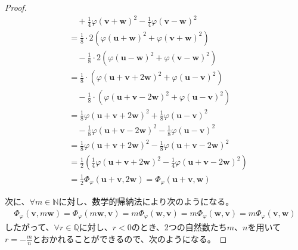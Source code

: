 \documentclass[dvipdfmx]{jsarticle}
\begin{document}
\begin{proof}
\begin{align*}
&\quad + \frac{1}{4}{\varphi\left( \mathbf{v} + \mathbf{w} \right)}^{2} - \frac{1}{4}{\varphi\left( \mathbf{v} - \mathbf{w} \right)}^{2}\\
&= \frac{1}{8} \cdot 2\left( {\varphi\left( \mathbf{u} + \mathbf{w} \right)}^{2} + {\varphi\left( \mathbf{v} + \mathbf{w} \right)}^{2} \right) \\
&\quad - \frac{1}{8} \cdot 2\left( {\varphi\left( \mathbf{u} - \mathbf{w} \right)}^{2} + {\varphi\left( \mathbf{v} - \mathbf{w} \right)}^{2} \right)\\
&= \frac{1}{8} \cdot \left( {\varphi\left( \mathbf{u} + \mathbf{v} + 2\mathbf{w} \right)}^{2} + {\varphi\left( \mathbf{u} - \mathbf{v} \right)}^{2} \right) \\
&\quad - \frac{1}{8} \cdot \left( {\varphi\left( \mathbf{u} + \mathbf{v} - 2\mathbf{w} \right)}^{2} + {\varphi\left( \mathbf{u} - \mathbf{v} \right)}^{2} \right)\\
&= \frac{1}{8}{\varphi\left( \mathbf{u} + \mathbf{v} + 2\mathbf{w} \right)}^{2} + \frac{1}{8}{\varphi\left( \mathbf{u} - \mathbf{v} \right)}^{2} \\
&\quad - \frac{1}{8}{\varphi\left( \mathbf{u} + \mathbf{v} - 2\mathbf{w} \right)}^{2} - \frac{1}{8}{\varphi\left( \mathbf{u} - \mathbf{v} \right)}^{2}\\
&= \frac{1}{8}{\varphi\left( \mathbf{u} + \mathbf{v} + 2\mathbf{w} \right)}^{2} - \frac{1}{8}{\varphi\left( \mathbf{u} + \mathbf{v} - 2\mathbf{w} \right)}^{2}\\
&= \frac{1}{2}\left( \frac{1}{4}{\varphi\left( \mathbf{u} + \mathbf{v} + 2\mathbf{w} \right)}^{2} - \frac{1}{4}{\varphi\left( \mathbf{u} + \mathbf{v} - 2\mathbf{w} \right)}^{2} \right)\\
&= \frac{1}{2}\varPhi_{\varphi}\left( \mathbf{u} + \mathbf{v},2\mathbf{w} \right) = \varPhi_{\varphi}\left( \mathbf{u} + \mathbf{v},\mathbf{w} \right)
\end{align*}\par
次に、$\forall m \in \mathbb{N}$に対し、数学的帰納法により次のようになる。
\begin{align*}
\varPhi_{\varphi}\left( \mathbf{v},m\mathbf{w} \right) = \varPhi_{\varphi}\left( m\mathbf{w},\mathbf{v} \right) = m\varPhi_{\varphi}\left( \mathbf{w},\mathbf{v} \right) = m\varPhi_{\varphi}\left( \mathbf{w},\mathbf{v} \right) = m\varPhi_{\varphi}\left( \mathbf{v},\mathbf{w} \right)
\end{align*}
したがって、$\forall r \in \mathbb{Q}$に対し、$r < 0$のとき、2つの自然数たち$m$、$n$を用いて$r = - \frac{m}{n}$とおかれることができるので、次のようになる。

\end{proof}
\end{document}

